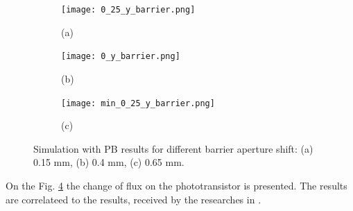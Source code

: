 \begin{figure}[H]
  \centering
  \begin{subfigure}[b]{0.3\textwidth}
    \texttt{[image: 0\_25\_y\_barrier.png]}
    \centering
    \label{fig:0_25_y_barrier}
    \caption*{(a)}
  \end{subfigure}
  \begin{subfigure}[b]{0.3\textwidth}
    \texttt{[image: 0\_y\_barrier.png]}
    \label{fig:0_y_barrier}
    \caption*{(b)}
  \end{subfigure}
  \begin{subfigure}[b]{0.3\textwidth}
    \texttt{[image: min\_0\_25\_y\_barrier.png]}
    \label{fig:min_0_25_y_barrier}
    \caption*{(c)}
  \end{subfigure}
  \label{fig:LED_PT_simulation_vs_bar}
  \caption{Simulation with PB results for different barrier aperture shift: (a) 0.15 mm, (b) 0.4 mm, (c) 0.65 mm.}
\end{figure}


On the Fig. \ref{fig:LED_PT_simulation_vs_bar} the change of flux on the phototransistor is presented. The results are correlateed to the results, received by the researches in 
\cite{my_love_pressure_photosensor}.

    
    



